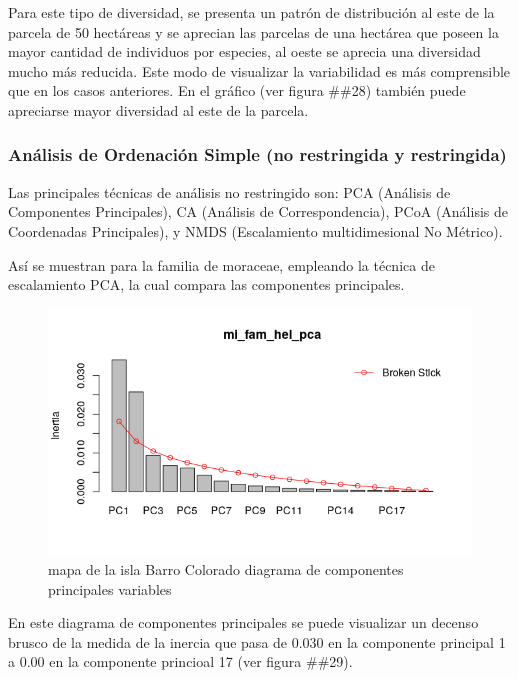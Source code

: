 \documentclass[11pt,]{article}
\begin{document}
Para este tipo de diversidad, se presenta un patrón de distribución al
este de la parcela de 50 hectáreas y se aprecian las parcelas de una
hectárea que poseen la mayor cantidad de individuos por especies, al
oeste se aprecia una diversidad mucho más reducida. Este modo de
visualizar la variabilidad es más comprensible que en los casos
anteriores. En el gráfico (ver figura \#\#28) también puede apreciarse
mayor diversidad al este de la parcela.

\subsubsection{Análisis de Ordenación Simple (no restringida y
restringida)}\label{anuxe1lisis-de-ordenaciuxf3n-simple-no-restringida-y-restringida}

Las principales técnicas de análisis no restringido son: PCA (Análisis
de Componentes Principales), CA (Análisis de Correspondencia), PCoA
(Análisis de Coordenadas Principales), y NMDS (Escalamiento
multidimesional No Métrico).

Así se muestran para la familia de moraceae, empleando la técnica de
escalamiento PCA, la cual compara las componentes principales.

\begin{figure}
\centering
\includegraphics[width=1.00000\textwidth]{mi_fam_hel_pca.png}
\caption{mapa de la isla Barro Colorado diagrama de componentes
principales variables\label{fig:bci_map}}
\end{figure}

En este diagrama de componentes principales se puede visualizar un
decenso brusco de la medida de la inercia que pasa de 0.030 en la
componente principal 1 a 0.00 en la componente princioal 17 (ver figura
\#\#29).
\end{document}
